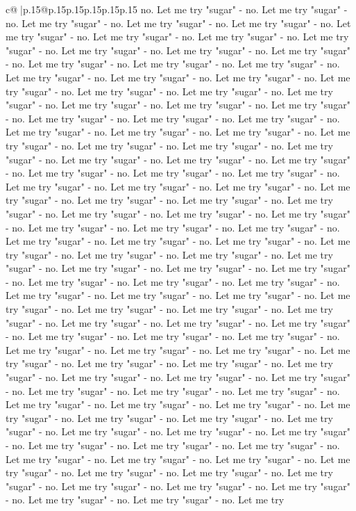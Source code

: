 \documentclass{article}
\begin{document}
{\begin{supertabular}{c@{$\;$}|p{.15\linewidth}@{}p{.15\linewidth}p{.15\linewidth}p{.15\linewidth}p{.15\linewidth}p{.15\linewidth}}
{{{no. Let me try "sugar" {-} no. Let me try "sugar" {-} no. Let me try "sugar" {-} no. Let me try "sugar" {-} no. Let me try "sugar" {-} no. Let me try "sugar" {-} no. Let me try "sugar" {-} no. Let me try "sugar" {-} no. Let me try "sugar" {-} no. Let me try "sugar" {-} no. Let me try "sugar" {-} no. Let me try "sugar" {-} no. Let me try "sugar" {-} no. Let me try "sugar" {-} no. Let me try "sugar" {-} no. Let me try "sugar" {-} no. Let me try "sugar" {-} no. Let me try "sugar" {-} no. Let me try "sugar" {-} no. Let me try "sugar" {-} no. Let me try "sugar" {-} no. Let me try "sugar" {-} no. Let me try "sugar" {-} no. Let me try "sugar" {-} no. Let me try "sugar" {-} no. Let me try "sugar" {-} no. Let me try "sugar" {-} no. Let me try "sugar" {-} no. Let me try "sugar" {-} no. Let me try "sugar" {-} no. Let me try "sugar" {-} no. Let me try "sugar" {-} no. Let me try "sugar" {-} no. Let me try "sugar" {-} no. Let me try "sugar" {-} no. Let me try "sugar" {-} no. Let me try "sugar" {-} no. Let me try "sugar" {-} no. Let me try "sugar" {-} no. Let me try "sugar" {-} no. Let me try "sugar" {-} no. Let me try "sugar" {-} no. Let me try "sugar" {-} no. Let me try "sugar" {-} no. Let me try "sugar" {-} no. Let me try "sugar" {-} no. Let me try "sugar" {-} no. Let me try "sugar" {-} no. Let me try "sugar" {-} no. Let me try "sugar" {-} no. Let me try "sugar" {-} no. Let me try "sugar" {-} no. Let me try "sugar" {-} no. Let me try "sugar" {-} no. Let me try "sugar" {-} no. Let me try "sugar" {-} no. Let me try "sugar" {-} no. Let me try "sugar" {-} no. Let me try "sugar" {-} no. Let me try "sugar" {-} no. Let me try "sugar" {-} no. Let me try "sugar" {-} no. Let me try "sugar" {-} no. Let me try "sugar" {-} no. Let me try "sugar" {-} no. Let me try "sugar" {-} no. Let me try "sugar" {-} no. Let me try "sugar" {-} no. Let me try "sugar" {-} no. Let me try "sugar" {-} no. Let me try "sugar" {-} no. Let me try "sugar" {-} no. Let me try "sugar" {-} no. Let me try "sugar" {-} no. Let me try "sugar" {-} no. Let me try "sugar" {-} no. Let me try "sugar" {-} no. Let me try "sugar" {-} no. Let me try "sugar" {-} no. Let me try "sugar" {-} no. Let me try "sugar" {-} no. Let me try "sugar" {-} no. Let me try "sugar" {-} no. Let me try "sugar" {-} no. Let me try "sugar" {-} no. Let me try "sugar" {-} no. Let me try "sugar" {-} no. Let me try "sugar" {-} no. Let me try "sugar" {-} no. Let me try "sugar" {-} no. Let me try "sugar" {-} no. Let me try "sugar" {-} no. Let me try "sugar" {-} no. Let me try "sugar" {-} no. Let me try "sugar" {-} no. Let me try "sugar" {-} no. Let me try "sugar" {-} no. Let me try "sugar" {-} no. Let me try "sugar" {-} no. Let me try "sugar" {-} no. Let me try "sugar" {-} no. Let me try "sugar" {-} no. Let me try "sugar" {-} no. Let me try "sugar" {-} no. Let me try "sugar" {-} no. Let me try "sugar" {-} no. Let me try "sugar" {-} no. Let me try "sugar" {-} no. Let me try "sugar" {-} no. Let me try "sugar" {-} no. Let me try "sugar" {-} no. Let me try "sugar" {-} no. Let me try "sugar" {-} no. Let me try "sugar" {-} no. Let me try "sugar" {-} no. Let me try "sugar" {-} no. Let me try "sugar" {-} no. Let me try "sugar" {-} no. Let me try }}}
\end{supertabular}}
\end{document}
